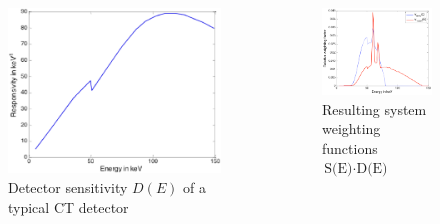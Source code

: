 \begin{frame}
\begin{columns}[c, onlytextwidth]
\begin{column}{0.33\textwidth}
\begin{figure}[]
                \includegraphics[width=\textwidth]{images/dual2.eps}
                \caption{Detector sensitivity $D(E)$ of a typical CT detector}
            \end{figure}
        \end{column}\begin{column}{0.33\textwidth}
            \begin{figure}[]
                \centering
                \includegraphics[width=\textwidth]{images/dual3.eps}
                \caption{Resulting system weighting functions $\text{S(E)}\cdot\text{D(E)}$}
            \end{figure}

\end{column}
\end{columns}
\end{frame}
